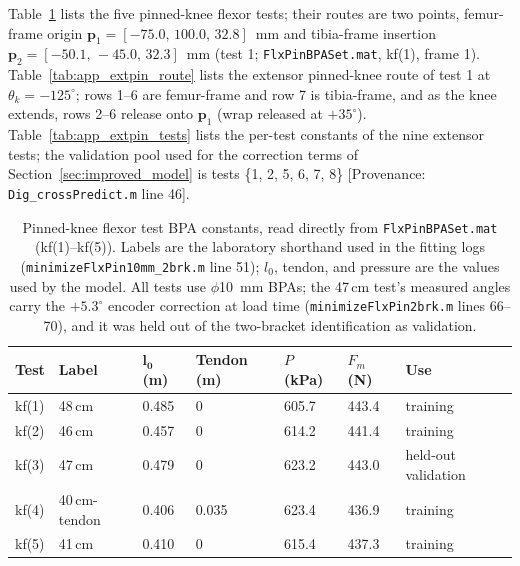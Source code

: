 Table~\ref{tab:app_flxpin_tests} lists the five pinned-knee flexor tests; their routes are two points, femur-frame origin $\mathbf{p}_{1} = [-75.0,\,100.0,\,32.8]$~mm and tibia-frame insertion $\mathbf{p}_{2} = [-50.1,\,-45.0,\,32.3]$~mm (test 1; \texttt{FlxPinBPASet.mat}, kf(1), frame 1). Table~\ref{tab:app_extpin_route} lists the extensor pinned-knee route of test 1 at $\theta_{k}=-125^{\circ}$; rows 1--6 are femur-frame and row 7 is tibia-frame, and as the knee extends, rows 2--6 release onto $\mathbf{p}_{1}$ (wrap released at $+35^{\circ}$). Table~\ref{tab:app_extpin_tests} lists the per-test constants of the nine extensor tests; the validation pool used for the correction terms of Section~\ref{sec:improved_model} is tests \{1, 2, 5, 6, 7, 8\} [Provenance: \texttt{Dig\_crossPredict.m} line 46].

\begin{table}[htbp]
\caption{Pinned-knee flexor test BPA constants, read directly from \texttt{FlxPinBPASet.mat} (kf(1)--kf(5)). Labels are the laboratory shorthand used in the fitting logs (\texttt{minimizeFlxPin10mm\_2brk.m} line 51); $l_{0}$, tendon, and pressure are the values used by the model. All tests use $\phi$\qty{10}{\mm} BPAs; the 47\,cm test's measured angles carry the $+5.3^{\circ}$ encoder correction at load time (\texttt{minimizeFlxPin2brk.m} lines 66--70), and it was held out of the two-bracket identification as validation.}
\label{tab:app_flxpin_tests}
\begin{tabular}{@{}lllllll@{}}
\toprule
\textbf{Test} & \textbf{Label} & $\boldsymbol{l_{0}}$ (m) & Tendon (m) & $P$ (kPa) & $F_{m}$ (N) & \textbf{Use} \\
\midrule
kf(1) & 48\,cm         & 0.485 & 0     & 605.7 & 443.4 & training \\
kf(2) & 46\,cm         & 0.457 & 0     & 614.2 & 441.4 & training \\
kf(3) & 47\,cm         & 0.479 & 0     & 623.2 & 443.0 & held-out validation \\
kf(4) & 40\,cm-tendon  & 0.406 & 0.035 & 623.4 & 436.9 & training \\
kf(5) & 41\,cm         & 0.410 & 0     & 615.4 & 437.3 & training \\
\bottomrule
\end{tabular}
\end{table}

